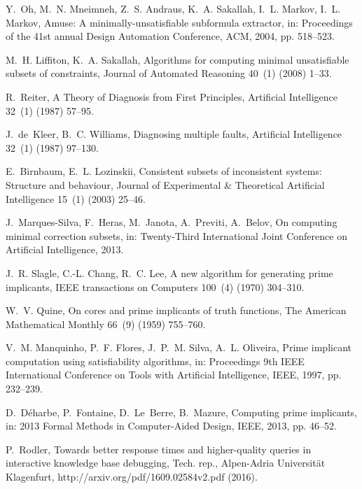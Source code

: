 \documentclass[]{elsarticle}
\begin{document}
\begin{thebibliography}{10}
		Y.~Oh, M.~N. Mneimneh, Z.~S. Andraus, K.~A. Sakallah, I.~L. Markov, I.~L.
		Markov, Amuse: A minimally-unsatisfiable subformula extractor, in:
		Proceedings of the 41st annual Design Automation Conference, ACM, 2004, pp.
		518--523.
		
		M.~H. Liffiton, K.~A. Sakallah, Algorithms for computing minimal unsatisfiable
		subsets of constraints, Journal of Automated Reasoning 40~(1) (2008) 1--33.
		
		R.~Reiter, {A Theory of Diagnosis from First Principles}, Artificial
		Intelligence 32~(1) (1987) 57--95.
		
		J.~de~Kleer, B.~C. Williams, {Diagnosing multiple faults}, Artificial
		Intelligence 32~(1) (1987) 97--130.
		
		E.~Birnbaum, E.~L. Lozinskii, Consistent subsets of inconsistent systems:
		Structure and behaviour, Journal of Experimental \& Theoretical Artificial
		Intelligence 15~(1) (2003) 25--46.
		
		J.~Marques-Silva, F.~Heras, M.~Janota, A.~Previti, A.~Belov, On computing
		minimal correction subsets, in: Twenty-Third International Joint Conference
		on Artificial Intelligence, 2013.
		
		J.~R. Slagle, C.-L. Chang, R.~C. Lee, A new algorithm for generating prime
		implicants, IEEE transactions on Computers 100~(4) (1970) 304--310.
		
		W.~V. Quine, On cores and prime implicants of truth functions, The American
		Mathematical Monthly 66~(9) (1959) 755--760.
		
		V.~M. Manquinho, P.~F. Flores, J.~P.~M. Silva, A.~L. Oliveira, Prime implicant
		computation using satisfiability algorithms, in: Proceedings 9th IEEE
		International Conference on Tools with Artificial Intelligence, IEEE, 1997,
		pp. 232--239.
		
		D.~D{\'e}harbe, P.~Fontaine, D.~Le~Berre, B.~Mazure, Computing prime
		implicants, in: 2013 Formal Methods in Computer-Aided Design, IEEE, 2013, pp.
		46--52.
		
		P.~Rodler, Towards better response times and higher-quality queries in
		interactive knowledge base debugging, Tech. rep., Alpen-Adria Universit\"at
		Klagenfurt, http://arxiv.org/pdf/1609.02584v2.pdf (2016).
		

\end{thebibliography}
\end{document}
